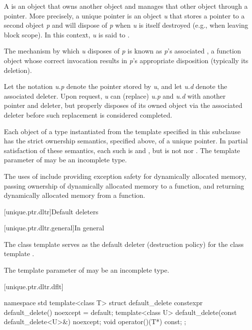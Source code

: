 \pnum
A  is an object that owns another object and
manages that other object through a pointer. More precisely, a unique pointer
is an object \textit{u} that stores a pointer to a second object \textit{p} and
will dispose of \textit{p} when \textit{u} is itself destroyed (e.g., when
leaving block scope). In this context, \textit{u} is said
to  .

\pnum
The mechanism by which \textit{u} disposes of \textit{p} is known as
\textit{p}'s associated , a function object whose correct
invocation results in \textit{p}'s appropriate disposition (typically its deletion).

\pnum
Let the notation \textit{u.p} denote the pointer stored by \textit{u}, and
let \textit{u.d} denote the associated deleter. Upon request, \textit{u} can
 (replace) \textit{u.p} and \textit{u.d} with another pointer and
deleter, but properly disposes of its owned object via the associated
deleter before such replacement is considered completed.

\pnum
Each object of a type  instantiated from the  template
specified in this subclause has the strict ownership semantics, specified above,
of a unique pointer. In partial satisfaction of these semantics, each such 
is  and , but is not
 nor .
The template parameter  of  may be an incomplete type.

\pnum
\begin{note}
The uses
of  include providing exception safety for
dynamically allocated memory, passing ownership of dynamically allocated
memory to a function, and returning dynamically allocated memory from a
function.
\end{note}

[unique.ptr.dltr]{Default deleters}

[unique.ptr.dltr.general]{In general}

\pnum
The class template  serves as the default deleter (destruction policy)
for the class template .

\pnum
The template parameter  of  may be
an incomplete type.

[unique.ptr.dltr.dflt]{}

\begin{codeblock}
namespace std {
  template<class T> struct default_delete {
    constexpr default_delete() noexcept = default;
    template<class U> default_delete(const default_delete<U>&) noexcept;
    void operator()(T*) const;
  };
}
\end{codeblock}

